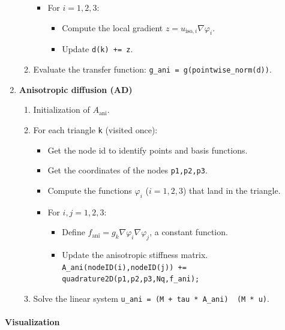 \documentclass{report}
\renewcommand\phi{\varphi}
\newcommand\bslash{\symbol{`\\}}
\def\iso{\text{iso}}
\def\ani{\text{ani}}
\begin{document}
\begin{enumerate}
\begin{enumerate}
\begin{itemize}
			\item
			For $i = 1,2,3$:
			\begin{itemize}
				\item
				Compute the local gradient $z = u_{\iso,i} \nabla \phi_i$.
				\item
				Update \texttt{d(k) += z}.
			\end{itemize}
		\end{itemize}
		\item 
		Evaluate the transfer function: \texttt{g\_ani = g(pointwise\_norm(d))}.
	\end{enumerate}
	\item
	\textbf{Anisotropic diffusion (AD)}
	\begin{enumerate}
		\item 
		Initialization of $A_\ani$.
		\item 
		For each triangle \texttt{k} (visited once):
		\begin{itemize}
			\item
			Get the node id to identify points and basis functions.
			\item 
			Get the coordinates of the nodes \texttt{p1,p2,p3}.
			\item 
			Compute the functions $\phi_i$ ($i=1,2,3$) that land in the triangle.
			\item 
			For $i,j=1,2,3$:
			\begin{itemize}
				\item
				Define $f_\ani = g_k \nabla \phi_i \nabla \phi_j$, a constant function.
				\item
				Update the anisotropic stiffness matrix.\\
				\texttt{A\_ani(nodeID(i),nodeID(j)) += quadrature2D(p1,p2,p3,Nq,f\_ani);}
			\end{itemize}
			
		\end{itemize}
		\item 
		Solve the linear system \texttt{u\_ani = (M + tau * A\_ani) \bslash\ (M * u)}.
	\end{enumerate}
\end{enumerate}

\paragraph{Visualization} 
\end{document}
